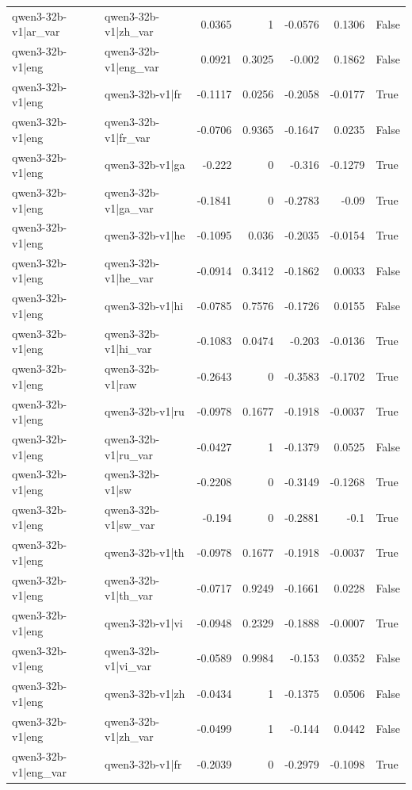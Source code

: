 \begin{table}
\begin{tabular}{l l r r r r l}
qwen3-32b-v1|ar_var & qwen3-32b-v1|zh_var & 0.0365 & 1 & -0.0576 & 0.1306 & False \\
qwen3-32b-v1|eng & qwen3-32b-v1|eng_var & 0.0921 & 0.3025 & -0.002 & 0.1862 & False \\
qwen3-32b-v1|eng & qwen3-32b-v1|fr & -0.1117 & 0.0256 & -0.2058 & -0.0177 & True \\
qwen3-32b-v1|eng & qwen3-32b-v1|fr_var & -0.0706 & 0.9365 & -0.1647 & 0.0235 & False \\
qwen3-32b-v1|eng & qwen3-32b-v1|ga & -0.222 & 0 & -0.316 & -0.1279 & True \\
qwen3-32b-v1|eng & qwen3-32b-v1|ga_var & -0.1841 & 0 & -0.2783 & -0.09 & True \\
qwen3-32b-v1|eng & qwen3-32b-v1|he & -0.1095 & 0.036 & -0.2035 & -0.0154 & True \\
qwen3-32b-v1|eng & qwen3-32b-v1|he_var & -0.0914 & 0.3412 & -0.1862 & 0.0033 & False \\
qwen3-32b-v1|eng & qwen3-32b-v1|hi & -0.0785 & 0.7576 & -0.1726 & 0.0155 & False \\
qwen3-32b-v1|eng & qwen3-32b-v1|hi_var & -0.1083 & 0.0474 & -0.203 & -0.0136 & True \\
qwen3-32b-v1|eng & qwen3-32b-v1|raw & -0.2643 & 0 & -0.3583 & -0.1702 & True \\
qwen3-32b-v1|eng & qwen3-32b-v1|ru & -0.0978 & 0.1677 & -0.1918 & -0.0037 & True \\
qwen3-32b-v1|eng & qwen3-32b-v1|ru_var & -0.0427 & 1 & -0.1379 & 0.0525 & False \\
qwen3-32b-v1|eng & qwen3-32b-v1|sw & -0.2208 & 0 & -0.3149 & -0.1268 & True \\
qwen3-32b-v1|eng & qwen3-32b-v1|sw_var & -0.194 & 0 & -0.2881 & -0.1 & True \\
qwen3-32b-v1|eng & qwen3-32b-v1|th & -0.0978 & 0.1677 & -0.1918 & -0.0037 & True \\
qwen3-32b-v1|eng & qwen3-32b-v1|th_var & -0.0717 & 0.9249 & -0.1661 & 0.0228 & False \\
qwen3-32b-v1|eng & qwen3-32b-v1|vi & -0.0948 & 0.2329 & -0.1888 & -0.0007 & True \\
qwen3-32b-v1|eng & qwen3-32b-v1|vi_var & -0.0589 & 0.9984 & -0.153 & 0.0352 & False \\
qwen3-32b-v1|eng & qwen3-32b-v1|zh & -0.0434 & 1 & -0.1375 & 0.0506 & False \\
qwen3-32b-v1|eng & qwen3-32b-v1|zh_var & -0.0499 & 1 & -0.144 & 0.0442 & False \\
qwen3-32b-v1|eng_var & qwen3-32b-v1|fr & -0.2039 & 0 & -0.2979 & -0.1098 & True \\

\end{tabular}
\end{table}
